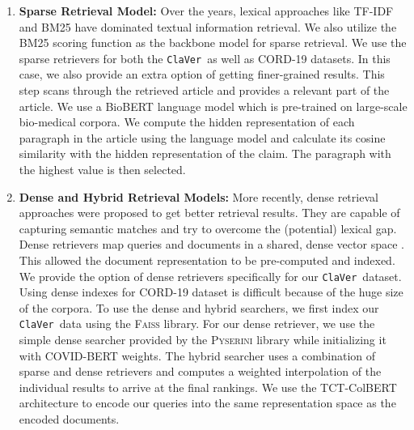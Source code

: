 \documentclass[11pt]{article}
\newcommand{\dataset}{\texttt{ClaVer}}
\begin{document}
\begin{enumerate}
\item \textbf{Sparse Retrieval Model:}
Over the years, lexical approaches like TF-IDF and BM25 have dominated textual information retrieval. We also utilize the BM25 scoring function \cite{robertson1995okapi} as the backbone model for sparse retrieval. We use the sparse retrievers for both the \dataset\ as well as CORD-19 datasets. In this case, we also provide an extra option of getting finer-grained results. This step scans through the retrieved article and provides a relevant part of the article. We use a BioBERT \cite{10.1093/bioinformatics/btz682} language model which is pre-trained on large-scale bio-medical corpora. We compute the hidden representation of each paragraph in the article using the language model and calculate its cosine similarity with the hidden representation of the claim. The paragraph with the highest value is then selected.


\item \textbf{Dense and Hybrid Retrieval Models:}
More recently, dense retrieval approaches were proposed to get better retrieval results. They are capable of capturing semantic matches and try to overcome the (potential) lexical gap. Dense retrievers map queries and documents in a shared, dense vector space \cite{gillick2018end}. This allowed the document representation to be pre-computed and indexed. We provide the option of dense retrievers specifically for our \dataset\ dataset. Using dense indexes for CORD-19 dataset is difficult because of the huge size of the corpora. To use the dense and hybrid searchers, we first index our \dataset\ data using the \textsc{Faiss} \cite{JDH17} library. For our dense retriever, we use the simple dense searcher provided by the \textsc{Pyserini} \cite{lin2021pyserini} library while initializing it with COVID-BERT weights. The hybrid searcher uses a combination of sparse and dense retrievers and computes a weighted interpolation of the individual results to arrive at the final rankings. We use the TCT-ColBERT \cite{lin2020distilling} architecture to encode our queries into the same representation space as the encoded documents.
\end{enumerate}

\end{document}
